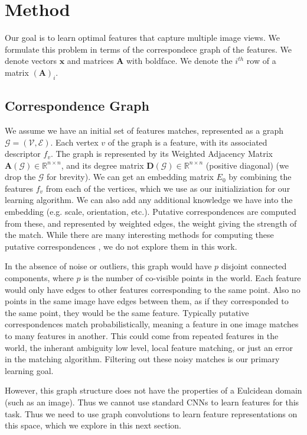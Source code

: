 \documentclass[10pt,twocolumn,letterpaper]{article}
\newcommand{\bR}{\mathbb{R}}
\newcommand{\mat}[1]{\mathbf{#1}}
\begin{document}
\section{Method}
Our goal is to learn optimal features that capture multiple image views.
We formulate this problem in terms of the correspondece graph of the features.
We denote vectors $\mat{x}$ and matrices $\mat{A}$ with boldface.
We denote the $i^{th}$ row of a matrix $(\mat{A})_i$.
\subsection{Correspondence Graph}
We assume we have an initial set of features matches, represented as a graph $\mathcal{G} = (\mathcal{V}, \mathcal{E})$.
Each vertex $v$ of the graph is a feature, with its associated descriptor $f_v$. 
The graph is represented by its Weighted Adjacency Matrix $\mat{A}(\mathcal{G}) \in \bR^{n \times n}$, and its degree matrix $\mat{D}(\mathcal{G}) \in \bR^{n \times n}$ (positive diagonal) (we drop the $\mathcal{G}$ for brevity).
We can get an embedding matrix $E_0$ by combining the features $f_v$ from each of the vertices, which we use as our initializiation for our learning algorithm.
We can also add any additional knowledge we have into the embedding (e.g. scale, orientation, etc.).
Putative correspondences are computed from these, and represented by weighted edges, the weight giving the strength of the match.
While there are many interesting methods for computing these putative correspondences \cite{suh2015subgraph, yi2018learning}, we do not explore them in this work.

In the absence of noise or outliers, this graph would have $p$ disjoint connected components, where $p$ is the number of co-visible points in the world.
Each feature would only have edges to other features corresponding to the same point.
Also no points in the same image have edges between them, as if they corresponded to the same point, they would be the same feature.
Typically putative correspondences match probabilistically, meaning a feature in one image matches to many features in another.
This could come from repeated features in the world, the inherant ambiguity low level, local feature matching, or just an error in the matching algorithm.
Filtering out these noisy matches is our primary learning goal.

However, this graph structure does not have the properties of a Eulcidean domain (such as an image).
Thus we cannot use standard CNNs to learn features for this task.
Thus we need to use graph convolutions to learn feature representations on this space, which we explore in this next section.
\end{document}
